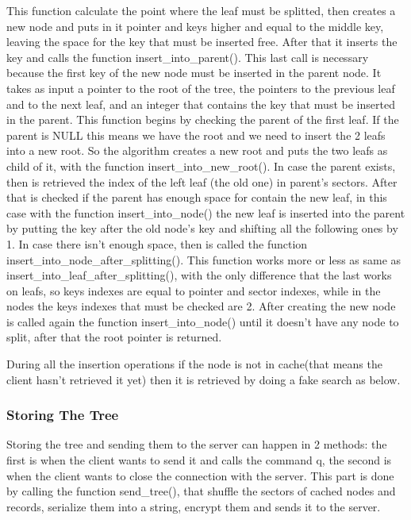This function calculate the point where the leaf must be splitted, then creates a new node and puts in it pointer and keys higher and equal to the middle key, leaving the space for the key that must be inserted free. After that it inserts the key and calls the function insert\_into\_parent(). This last call is necessary because the first key of the new node must be inserted in the parent node. It takes as input a pointer to the root of the tree, the pointers to the previous leaf and to the next leaf, and an integer that contains the key that must be inserted in the parent. This function begins by checking the parent of the first leaf. If the parent is NULL this means we have the root and we need to insert the 2 leafs into a new root. So the algorithm creates a new root and puts the two leafs as child of it, with the function insert\_into\_new\_root().
In case the parent exists, then is retrieved the index of the left leaf (the old one) in parent's sectors. After that is checked if the parent has enough space for contain the new leaf, in this case with the function insert\_into\_node() the new leaf is inserted into the parent by putting the key after the old node's key and shifting all the following ones by 1.
In case there isn't enough space, then is called the function insert\_into\_node\_after\_splitting(). This function works more or less as same as insert\_into\_leaf\_after\_splitting(), with the only difference that the last works on leafs, so keys indexes are equal to pointer and sector indexes, while in the nodes the keys indexes that must be checked are 2.
After creating the new node is called again the function insert\_into\_node() until it doesn't have any node to split, after that the root pointer is returned.

During all the insertion operations if the node is not in cache(that means the client hasn't retrieved it yet) then it is retrieved by doing a fake search as below.

\subsubsection{Storing The Tree}
Storing the tree and sending them to the server can happen in 2 methods: the first is when the client wants to send it and calls the command q, the second is when the client wants to close the connection with the server. This part is done by calling the function send\_tree(), that shuffle the sectors of cached nodes and records, serialize them into a string, encrypt them and sends it to the server.
